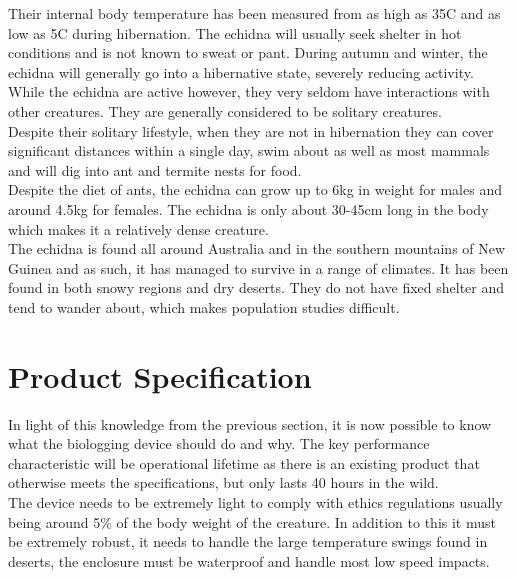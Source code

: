 \documentclass[12pt,openany,a4paper]{book}
\begin{document}
	Their internal body temperature has been measured from as high as 35\textdegree C and as low as 5\textdegree C during hibernation. The echidna will usually seek shelter in hot conditions and is not known to sweat or pant. During autumn and winter, the echidna will generally go into a hibernative state, severely reducing activity. \\
	
	While the echidna are active however, they very seldom have interactions with other creatures. They are generally considered to be solitary creatures. \\
	
	Despite their solitary lifestyle, when they are not in hibernation they can cover significant distances within a single day, swim about as well as most mammals and will dig into ant and termite nests for food. \\
	
	Despite the diet of ants, the echidna can grow up to 6kg in weight for males and around 4.5kg for females. The echidna is only about 30-45cm long in the body which makes it a relatively dense creature. \\

	The echidna is found all around Australia and in the southern mountains of New Guinea and as such, it has managed to survive in a range of climates. It has been found in both snowy regions and dry deserts. They do not have fixed shelter and tend to wander about, which makes population studies difficult. \\
	
	
	\section{Product Specification}
	In light of this knowledge from the previous section, it is now possible to know what the biologging device should do and why. The key performance characteristic will be operational lifetime as there is an existing product \cite{Freakley13} that otherwise meets the specifications, but only lasts 40 hours in the wild. \\
	
	The device needs to be extremely light to comply with ethics regulations \cite{Mamm87} usually being around 5\% of the body weight of the creature. In addition to this it must be extremely robust, it needs to handle the large temperature swings found in deserts, the enclosure must be waterproof and handle most low speed impacts. \\
	
\end{document}
